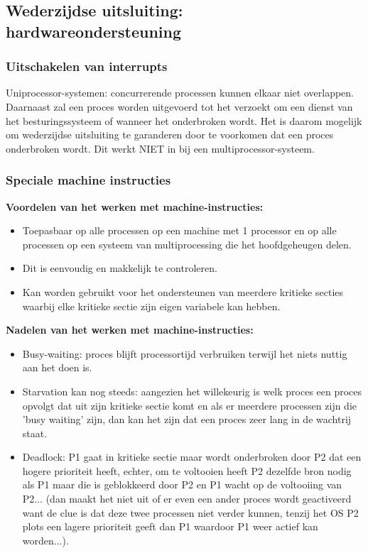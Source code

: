 \subsection{Wederzijdse uitsluiting: hardwareondersteuning}

\subsubsection{Uitschakelen van interrupts}

Uniprocessor-systemen: concurrerende processen kunnen elkaar niet overlappen. Daarnaast zal een proces worden uitgevoerd tot het verzoekt om een dienst van het besturingssysteem of wanneer het onderbroken wordt. Het is daarom mogelijk om wederzijdse uitsluiting te garanderen door te voorkomen dat een proces onderbroken wordt. Dit werkt NIET in bij een multiprocessor-systeem.

\subsubsection{Speciale machine instructies}



\textbf{Voordelen van het werken met machine-instructies:}

\begin{itemize}
\item Toepasbaar op alle processen op een machine met 1 processor en op alle processen op een systeem van multiprocessing die het hoofdgeheugen delen.
\item Dit is eenvoudig en makkelijk te controleren.
\item Kan worden gebruikt voor het ondersteunen van meerdere kritieke secties waarbij elke kritieke sectie zijn eigen variabele kan hebben.
\end{itemize}

\textbf{Nadelen van het werken met machine-instructies:}

\begin{itemize}
\item Busy-waiting: proces blijft processortijd verbruiken terwijl het niets nuttig aan het doen is.
\item Starvation kan nog steeds: aangezien het willekeurig is welk proces een proces opvolgt dat uit zijn kritieke sectie komt en als er meerdere processen zijn die 'busy waiting' zijn, dan kan het zijn dat een proces zeer lang in de wachtrij staat.
\item Deadlock: P1 gaat in kritieke sectie maar wordt onderbroken door P2 dat een hogere prioriteit heeft, echter, om te voltooien heeft P2 dezelfde bron nodig als P1 maar die is geblokkeerd door P2 en P1 wacht op de voltooiing van P2... (dan maakt het niet uit of er even een ander proces wordt geactiveerd want de clue is dat deze twee processen niet verder kunnen, tenzij het OS P2 plots een lagere prioriteit geeft dan P1 waardoor P1 weer actief kan worden...).
\end{itemize}
